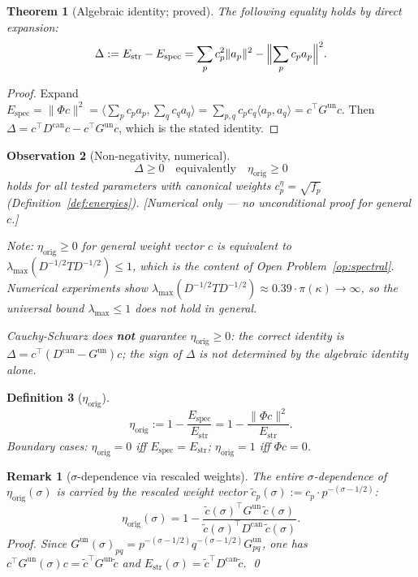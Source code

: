 \documentclass[11pt]{article}
\newtheorem{theorem}{Theorem}[section]
\newtheorem{definition}[theorem]{Definition}
\newtheorem{observation}[theorem]{Observation}
\newtheorem*{remark}{Remark}
\newcommand{\Estr}{E_{\mathrm{str}}}
\newcommand{\Espec}{E_{\mathrm{spec}}}
\newcommand{\etaorig}{\eta_{\mathrm{orig}}}
\newcommand{\Gun}{G^{\mathrm{un}}}
\newcommand{\Dcan}{D^{\mathrm{can}}}
\newcommand{\ceta}{c_p^{\eta}}
\newcommand{\fp}{f_p}
\begin{document}
\begin{theorem}[Algebraic identity; proved]
\label{thm:identity}
The following equality holds by direct expansion:
\[
\Delta:=\Estr-\Espec=\sum_p c_p^2\|a_p\|^2-\Bigl\|\sum_p c_p a_p\Bigr\|^2.
\]
\end{theorem}

\begin{proof}
Expand $\Espec=\|\Phi c\|^2=\bigl\langle\sum_p c_p a_p,\sum_q c_q
a_q\bigr\rangle=\sum_{p,q}c_p c_q\langle a_p,a_q\rangle=c^\top\Gun c$.
Then $\Delta=c^\top\Dcan c-c^\top\Gun c$, which is the stated identity.
\end{proof}

\begin{observation}[Non-negativity, numerical]
\label{obs:nonneg}
\[
\Delta\geq 0\quad\text{equivalently}\quad\etaorig\geq 0
\]
holds for all tested parameters with canonical weights
$\ceta=\sqrt{\fp}$ (Definition~\ref{def:energies}).
\emph{[Numerical only --- no unconditional proof for general $c$.]}

Note: $\etaorig\geq 0$ for general weight vector $c$ is equivalent to
$\lambda_{\max}(D^{-1/2}TD^{-1/2})\leq 1$, which is the content of
Open Problem~\ref{op:spectral}. Numerical experiments show
$\lambda_{\max}(D^{-1/2}TD^{-1/2})\approx 0.39\cdot\pi(\kappa)\to\infty$,
so the universal bound $\lambda_{\max}\leq 1$ does not hold in general.

\emph{Cauchy-Schwarz does \textbf{not} guarantee $\etaorig\geq 0$}: the
correct identity is $\Delta=c^\top(\Dcan-\Gun)c$; the sign of $\Delta$ is not
determined by the algebraic identity alone.
\end{observation}

\begin{definition}[$\etaorig$]
\label{def:eta}
\[
\etaorig:=1-\frac{\Espec}{\Estr}=1-\frac{\|\Phi c\|^2}{\Estr}.
\]
Boundary cases: $\etaorig=0$ iff $\Espec=\Estr$; $\etaorig=1$ iff $\Phi c=0$.
\end{definition}

\begin{remark}[$\sigma$-dependence via rescaled weights]
The entire $\sigma$-dependence of $\etaorig(\sigma)$ is carried by the
rescaled weight vector $\tilde{c}_p(\sigma):=c_p\cdot p^{-(\sigma-1/2)}$:
\[
\etaorig(\sigma)=1-\frac{\tilde{c}(\sigma)^\top\Gun\,\tilde{c}(\sigma)}
{\tilde{c}(\sigma)^\top\Dcan\,\tilde{c}(\sigma)}.
\]
\emph{Proof.} Since $\Gun(\sigma)_{pq}=p^{-(\sigma-1/2)}q^{-(\sigma-1/2)}\Gun_{pq}$,
one has $c^\top\Gun(\sigma)c=\tilde{c}^\top\Gun\tilde{c}$ and
$\Estr(\sigma)=\tilde{c}^\top\Dcan\tilde{c}$. \qed
\end{remark}
\end{document}

